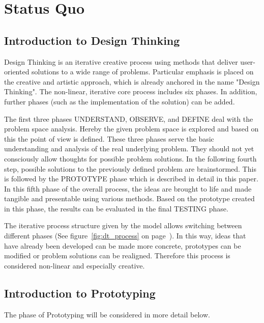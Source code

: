 \section{Status Quo}\label{sec:statusQuo}

\subsection{Introduction to Design Thinking}

Design Thinking is an iterative creative process using methods that deliver user-oriented solutions to a wide range of problems. Particular emphasis is placed on the creative and artistic approach, which is already anchored in the name "Design Thinking". The non-linear, iterative core process includes six phases. In addition, further phases (such as the implementation of the solution) can be added.

The first three phases UNDERSTAND, OBSERVE, and DEFINE deal with the problem space analysis. Hereby the given problem space is explored and based on this the point of view is defined. These three phases serve the basic understanding and analysis of the real underlying problem. They should not yet consciously allow thoughts for possible problem solutions. In the following fourth step, possible solutions to the previously defined problem are brainstormed. This is followed by the PROTOTYPE phase which is described in detail in this paper. In this fifth phase of the overall process, the ideas are brought to life and made tangible and presentable using various methods. Based on the prototype created in this phase, the results can be evaluated in the final TESTING phase. 

The iterative process structure given by the model allows switching between different phases (See figure~\ref{fig:dt_process} on page~\pageref{fig:dt_process}). In this way, ideas that have already been developed can be made more concrete, prototypes can be modified or problem solutions can be realigned. Therefore this process is considered non-linear and especially creative.

\subsection{Introduction to Prototyping}

The phase of Prototyping will be considered in more detail below. 

